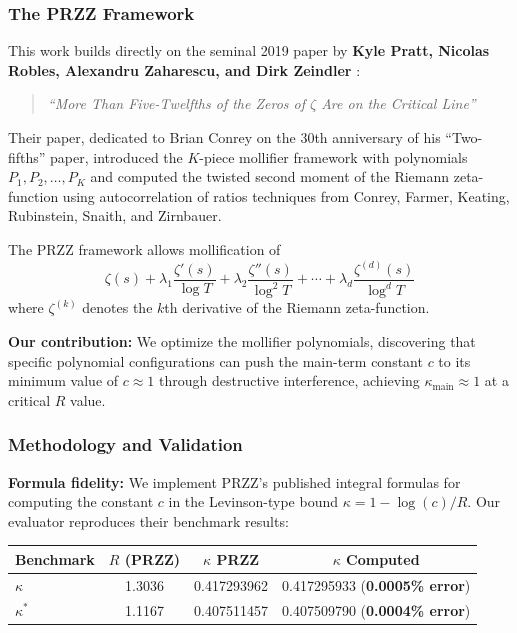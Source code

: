 \documentclass[11pt]{article}
\begin{document}
\subsubsection{The PRZZ Framework}

This work builds directly on the seminal 2019 paper by \textbf{Kyle Pratt, Nicolas Robles, Alexandru Zaharescu, and Dirk Zeindler} \cite{PRZZ2019}:

\begin{quotation}
\textit{``More Than Five-Twelfths of the Zeros of $\zeta$ Are on the Critical Line''}
\end{quotation}

Their paper, dedicated to Brian Conrey on the 30th anniversary of his ``Two-fifths'' paper, introduced the $K$-piece mollifier framework with polynomials $P_1, P_2, \ldots, P_K$ and computed the twisted second moment of the Riemann zeta-function using autocorrelation of ratios techniques from Conrey, Farmer, Keating, Rubinstein, Snaith, and Zirnbauer.

The PRZZ framework allows mollification of
\begin{equation}
\zeta(s) + \lambda_1 \frac{\zeta'(s)}{\log T} + \lambda_2 \frac{\zeta''(s)}{\log^2 T} + \cdots + \lambda_d \frac{\zeta^{(d)}(s)}{\log^d T}
\end{equation}
where $\zeta^{(k)}$ denotes the $k$th derivative of the Riemann zeta-function.

\textbf{Our contribution:} We optimize the mollifier polynomials, discovering that specific polynomial configurations can push the main-term constant $c$ to its minimum value of $c \approx 1$ through destructive interference, achieving $\kappa_{\text{main}} \approx 1$ at a critical $R$ value.

\subsubsection{Methodology and Validation}

\textbf{Formula fidelity:} We implement PRZZ's published integral formulas for computing the constant $c$ in the Levinson-type bound $\kappa = 1 - \log(c)/R$. Our evaluator reproduces their benchmark results:

\begin{center}
\begin{tabular}{lccc}
\toprule
Benchmark & $R$ (PRZZ) & $\kappa$ PRZZ & $\kappa$ Computed \\
\midrule
$\kappa$ & 1.3036 & 0.417293962 & 0.417295933 (\textbf{0.0005\% error}) \\
$\kappa^*$ & 1.1167 & 0.407511457 & 0.407509790 (\textbf{0.0004\% error}) \\
\bottomrule
\end{tabular}
\end{center}
\end{document}
